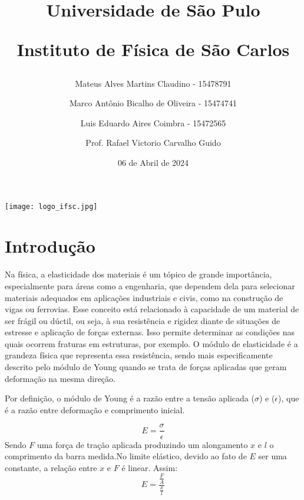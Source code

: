 \documentclass{article}
\begin{document}
\begin{titlepage}
\scshape
    \title{Universidade de São Pulo

    Instituto de Física de São Carlos}
    
    \author{Mateus Alves Martins Claudino - 15478791\and Marco Antônio Bicalho de Oliveira - 15474741\and Luis Eduardo Aires Coimbra - 15472565\and Prof. Rafael Victorio Carvalho Guido}
    \date{06 de Abril de 2024} 
   
    \begin{figure*}
        \centering
        \texttt{[image: logo\_ifsc.jpg]}   
    \end{figure*}
    
    
    
    
    \maketitle
\end{titlepage}
\tableofcontents
\newpage
\section{Introdução}
Na física, a elasticidade dos materiais é um tópico de grande importância, especialmente para áreas como a engenharia, que dependem dela para selecionar materiais adequados em aplicações industriais e civis, como na construção de vigas ou ferrovias.
Esse conceito está relacionado à capacidade de um material de ser frágil ou dúctil, ou seja, à sua resistência e rigidez diante de situações de estresse e aplicação de forças externas. Isso permite determinar as condições nas quais ocorrem fraturas em estruturas, por exemplo. O módulo de elasticidade é a grandeza física que representa essa resistência, sendo mais especificamente descrito pelo módulo de Young quando se trata de forças aplicadas que geram deformação na mesma direção.

Por definição, o módulo de Young é a razão entre a tensão aplicada ($\sigma$) e ($\epsilon$), que é a razão entre deformação e comprimento inicial.

\begin{equation}
    E = \frac{\sigma}{\epsilon}
\end{equation}
Sendo $F$ uma força de tração aplicada produzindo um alongamento $x$ e $l$ o comprimento da barra medida.No limite elástico, devido ao fato de $E$ ser uma constante, a relação entre $x$ e $F$ é linear. Assim:
\begin{equation}
    E = {\frac{\frac{F}{A}}{\frac{x}{l}}}
\end{equation}
 
\end{document}
